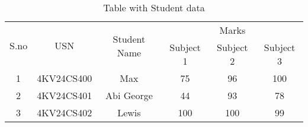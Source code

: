 \documentclass{article}
\begin{document}
	\begin{table}[h!]
		\begin{center}
			\caption{Table with Student data}
			\vspace{0.5cm}
			\label{tab:table 1}
			\begin{tabular}{|c|c|c|c|c|c|}
				\hline
				\multirow{2}{*}{S.no}&\multirow{2}{*}{USN}&\multirow{2}{*}{Student Name}&\multicolumn{3}{c|}{Marks}\\
				\cline{4-6}
				&&& Subject 1 & Subject 2 & Subject 3\\
				\hline
				1 & 4KV24CS400 & Max & 75 & 96 & 100\\
				\hline
				2 & 4KV24CS401 & Abi George & 44 & 93 & 78\\
				\hline
				3 & 4KV24CS402 & Lewis & 100 & 100 & 99\\
				\hline
			\end{tabular}
		\end{center}
	\end{table}
\end{document}
